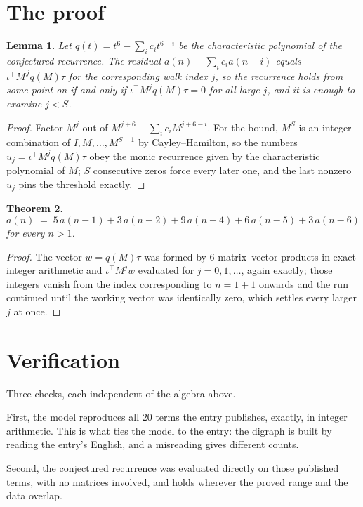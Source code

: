 \documentclass[11pt,a4paper]{article}
\theoremstyle{plain}
\newtheorem{theorem}{Theorem}
\newtheorem{lemma}[theorem]{Lemma}
\theoremstyle{definition}
\begin{document}
\section{The proof}

\begin{lemma}\label{lem:crit}
Let $q(t)=t^{6}-\sum_i c_it^{6-i}$ be the characteristic polynomial of the
conjectured recurrence. The residual $a(n)-\sum_ic_ia(n-i)$ equals
$\iota^{\!\top}M^{\,j}q(M)\tau$ for the corresponding walk index $j$, so the recurrence
holds from some point on if and only if $\iota^{\!\top}M^{j}q(M)\tau=0$ for all large $j$,
and it is enough to examine $j<S$.
\end{lemma}

\begin{proof}
Factor $M^{j}$ out of $M^{j+6}-\sum_ic_iM^{j+6-i}$. For the bound, $M^{S}$
is an integer combination of $I,M,\dots,M^{S-1}$ by Cayley--Hamilton, so the numbers
$u_j=\iota^{\!\top}M^{j}q(M)\tau$ obey the monic recurrence given by the characteristic
polynomial of $M$; $S$ consecutive zeros force every later one, and the last nonzero $u_j$
pins the threshold exactly.
\end{proof}

\begin{theorem}
\[
a(n)\;=\;5\,a(n-1) + 3\,a(n-2) + 9\,a(n-4) + 6\,a(n-5) + 3\,a(n-6)
\]
for every $n>1$.
\end{theorem}

\begin{proof}
The vector $w=q(M)\tau$ was formed by $6$ matrix--vector products in exact integer
arithmetic and $\iota^{\!\top}M^{j}w$ evaluated for $j=0,1,\dots$, again exactly; those
integers vanish from the index corresponding to $n=1+1$ onwards and the run continued
until the working vector was identically zero, which settles every larger $j$ at once.
\end{proof}

\section{Verification}

Three checks, each independent of the algebra above.

First, the model reproduces all $20$ terms the entry publishes, exactly, in integer
arithmetic. This is what ties the model to the entry: the digraph is built by reading the
entry's English, and a misreading gives different counts.

Second, the conjectured recurrence was evaluated directly on those published terms, with no
matrices involved, and holds wherever the proved range and the data overlap.
\end{document}
